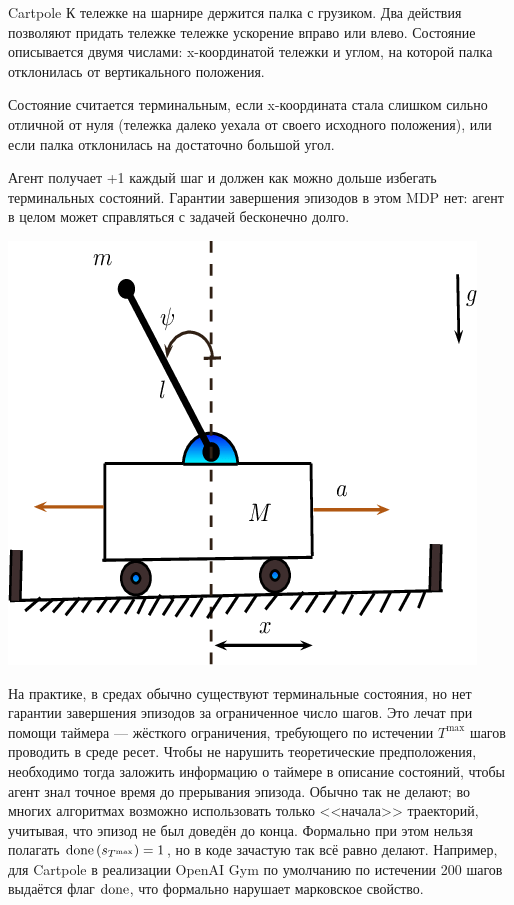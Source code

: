 \begin{exampleBox}[righthand ratio=0.25, sidebyside, sidebyside align=center, lower separated=false]{Cartpole}
К тележке на шарнире держится палка с грузиком. Два действия позволяют придать тележке тележке ускорение вправо или влево. Состояние описывается двумя числами: x-координатой тележки и углом, на которой палка отклонилась от вертикального положения.

Состояние считается терминальным, если x-координата стала слишком сильно отличной от нуля (тележка далеко уехала от своего исходного положения), или если палка отклонилась на достаточно большой угол.

Агент получает +1 каждый шаг и должен как можно дольше избегать терминальных состояний. Гарантии завершения эпизодов в этом MDP нет: агент в целом может справляться с задачей бесконечно долго.

\tcblower
\includegraphics[width=\textwidth]{Images/cartpole.png}
\end{exampleBox}

\begin{remark}
На практике, в средах обычно существуют терминальные состояния, но нет гарантии завершения эпизодов за ограниченное число шагов. Это лечат при помощи таймера --- жёсткого ограничения, требующего по истечении $T^{\max}$ шагов проводить в среде ресет. Чтобы не нарушить теоретические предположения, необходимо тогда заложить информацию о таймере в описание состояний, чтобы агент знал точное время до прерывания эпизода. Обычно так не делают; во многих алгоритмах возможно использовать только <<начала>> траекторий, учитывая, что эпизод не был доведён до конца. Формально при этом нельзя полагать $\done \left( s_{T^{\max}} \right) \HM= 1$, но в коде зачастую так всё равно делают. Например, для Cartpole в реализации OpenAI Gym по умолчанию по истечении 200 шагов выдаётся флаг $\mathrm{done}$, что формально нарушает марковское свойство.
\end{remark}


